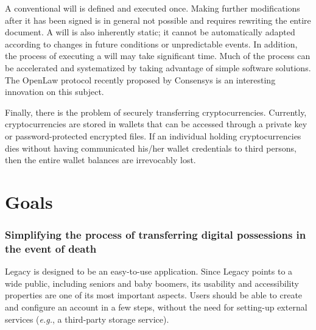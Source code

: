 A conventional will is defined and executed once. Making further modifications after it has been signed is in general not possible and requires rewriting the entire document. A will is also inherently static; it cannot be automatically adapted according to changes in future conditions or unpredictable events. In addition, the process of executing a will may take significant time. Much of the process can be accelerated and systematized by taking advantage of simple software solutions. 
The OpenLaw protocol recently proposed by Consensys \cite{OpenLaw} is an interesting innovation on this subject. 

Finally, there is the problem of securely transferring cryptocurrencies. Currently, cryptocurrencies are stored in wallets that can be accessed through a private key or password-protected encrypted files. If an individual holding cryptocurrencies dies without having communicated his/her wallet credentials to third persons, then the entire wallet balances are irrevocably lost. 


\section{Goals} %
\label{sec:goals}

\subsubsection*{Simplifying the process of transferring digital possessions in the event of death} %
\label{ssub:simplifying_the_process_of_transferring_your_digital_possessions_after_your_death}
Legacy is designed to be an easy-to-use application. 
Since Legacy points to a wide public, including seniors and baby boomers, its usability and accessibility properties are one of its most important aspects.
Users should be able to create and configure an account in a few steps, without the need for setting-up external services (\textit{e.g.}, a third-party storage service). 

